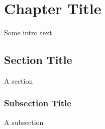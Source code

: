 \chapter{Chapter Title}\label{chap:modellingmethods}
Some intro text\\

\section*{Section Title}
A section\\
\subsection*{Subsection Title}
A subsection\\







%
